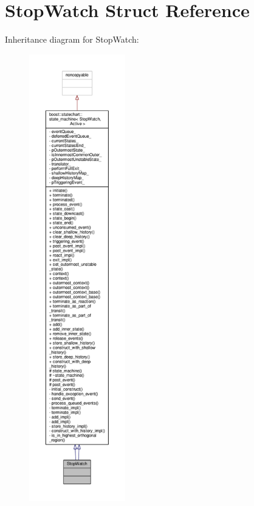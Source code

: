 \hypertarget{struct_stop_watch}{}\section{Stop\+Watch Struct Reference}
\label{struct_stop_watch}


Inheritance diagram for Stop\+Watch\+:
\nopagebreak
\begin{figure}[H]
\begin{center}
\leavevmode
\includegraphics[height=550pt]{struct_stop_watch__inherit__graph}
\end{center}
\end{figure}


